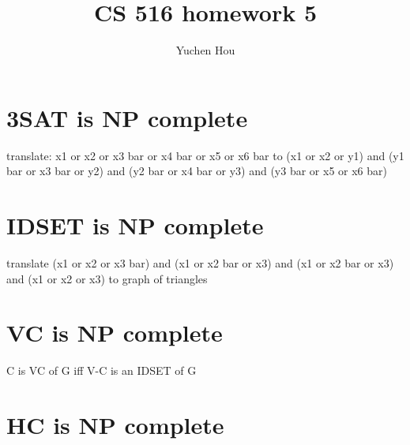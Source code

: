 \documentclass{article}
\begin{document}
\lstset{language=python, tabsize=4}
\title{CS 516 homework 5}
\author{Yuchen Hou}
\maketitle

\section{3SAT is NP complete}
translate: x1 or x2 or x3 bar or x4 bar or x5 or x6 bar to (x1 or x2 or y1) and (y1 bar or x3 bar or y2) and (y2 bar or x4 bar or y3) and (y3 bar or x5 or x6 bar)

\section{IDSET is NP complete}
translate (x1 or x2 or x3 bar) and (x1 or x2 bar or x3) and (x1 or x2 bar or x3) and (x1 or x2 or x3) to graph of triangles

\section{VC is NP complete}
C is VC of G iff V-C is an IDSET of G

\section{HC is NP complete}
\end{document}
